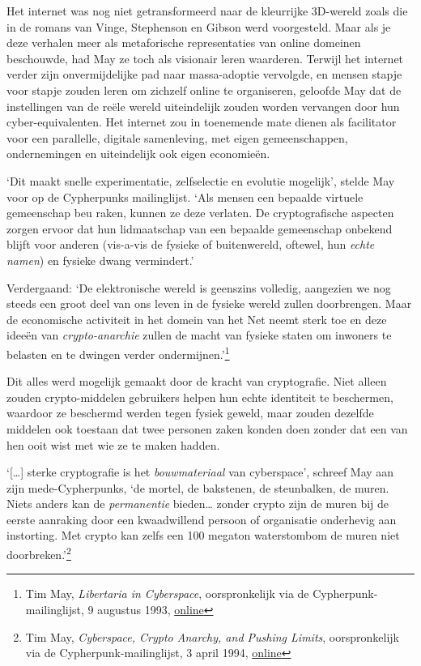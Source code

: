 \documentclass[
  a5paper,
  smalldemyvopaper,11pt,twoside,onecolumn,openright,extrafontsizes,
hidelinks]{memoir}
\begin{document}
Het internet was nog niet getransformeerd naar de kleurrijke 3D-wereld
zoals die in de romans van Vinge, Stephenson en Gibson werd voorgesteld.
Maar als je deze verhalen meer als metaforische representaties van
online domeinen beschouwde, had May ze toch als visionair leren
waarderen. Terwijl het internet verder zijn onvermijdelijke pad naar
massa-adoptie vervolgde, en mensen stapje voor stapje zouden leren om
zichzelf online te organiseren, geloofde May dat de instellingen van de
reële wereld uiteindelijk zouden worden vervangen door hun
cyber-equivalenten. Het internet zou in toenemende mate dienen als
facilitator voor een parallelle, digitale samenleving, met eigen
gemeenschappen, ondernemingen en uiteindelijk ook eigen economieën.

`Dit maakt snelle experimentatie, zelfselectie en evolutie mogelijk',
stelde May voor op de Cypherpunks mailinglijst. `Als mensen een bepaalde
virtuele gemeenschap beu raken, kunnen ze deze verlaten. De
cryptografische aspecten zorgen ervoor dat hun lidmaatschap van een
bepaalde gemeenschap onbekend blijft voor anderen (vis-a-vis de fysieke
of buitenwereld, oftewel, hun \emph{echte namen}) en fysieke dwang
vermindert.'

Verdergaand: `De elektronische wereld is geenszins volledig, aangezien
we nog steeds een groot deel van ons leven in de fysieke wereld zullen
doorbrengen. Maar de economische activiteit in het domein van het Net
neemt sterk toe en deze ideeën van \emph{crypto-anarchie} zullen de
macht van fysieke staten om inwoners te belasten en te dwingen verder
ondermijnen.'\footnote{Tim May, \emph{Libertaria in Cyberspace},
  oorspronkelijk via de Cypherpunk-mailinglijst, 9 augustus 1993,
  \href{https://cypherpunks.venona.com/date/1993/08/msg00168.html}{online}}

Dit alles werd mogelijk gemaakt door de kracht van cryptografie. Niet
alleen zouden crypto-middelen gebruikers helpen hun echte identiteit te
beschermen, waardoor ze beschermd werden tegen fysiek geweld, maar
zouden dezelfde middelen ook toestaan dat twee personen zaken konden
doen zonder dat een van hen ooit wist met wie ze te maken hadden.

`{[}\ldots{]} sterke cryptografie is het \emph{bouwmateriaal} van
cyberspace', schreef May aan zijn mede-Cypherpunks, `de mortel, de
bakstenen, de steunbalken, de muren. Niets anders kan de
\emph{permanentie} bieden\ldots{} zonder crypto zijn de muren bij de
eerste aanraking door een kwaadwillend persoon of organisatie onderhevig
aan instorting. Met crypto kan zelfs een 100 megaton waterstombom de
muren niet doorbreken.'\footnote{Tim May, \emph{Cyberspace, Crypto
  Anarchy, and Pushing Limits}, oorspronkelijk via de
  Cypherpunk-mailinglijst, 3 april 1994,
  \href{https://cypherpunks.venona.com/date/1994/04/msg00096.html}{online}}
\end{document}
